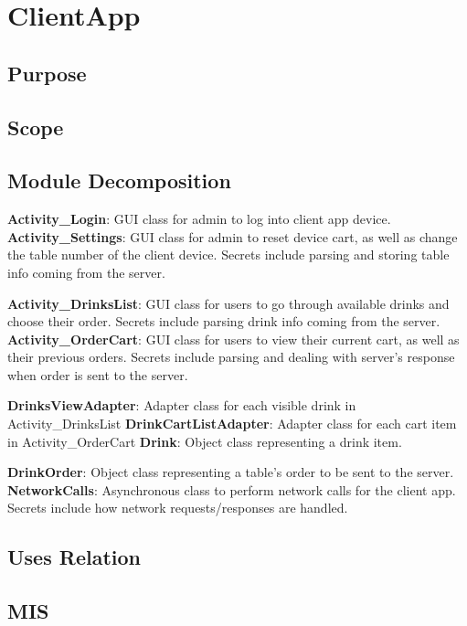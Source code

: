 \documentclass [10pt]{article}
\begin{document}

\section {ClientApp}

\subsection{Purpose}

\subsection{Scope}

\subsection{Module Decomposition}

\textbf{Activity\_Login}: GUI class for admin to log into client app device.
\textbf{Activity\_Settings}: GUI class for admin to reset device cart, as well as change the table number of the client device. Secrets include parsing and storing table info coming from the server.

\textbf{Activity\_DrinksList}: GUI class for users to go through available drinks and choose their order. Secrets include parsing drink info coming from the server.
\textbf{Activity\_OrderCart}: GUI class for users to view their current cart, as well as their previous orders. Secrets include parsing and dealing with server’s response when order is sent to the server.

\textbf{DrinksViewAdapter}: Adapter class for each visible drink in Activity\_DrinksList
\textbf{DrinkCartListAdapter}: Adapter class for each cart item in Activity\_OrderCart
\textbf{Drink}: Object class representing a drink item.

\textbf{DrinkOrder}: Object class representing a table’s order to be sent to the server. 
\textbf{NetworkCalls}: Asynchronous class to perform network calls for the client app. Secrets include how network requests/responses are handled.

\subsection{Uses Relation}

\subsection{MIS}
\end{document}
